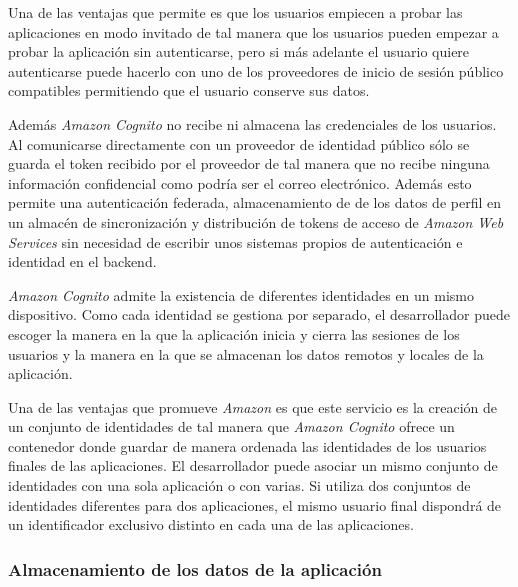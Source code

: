\documentclass{article}
\begin{document}
	Una de las ventajas que permite es que los usuarios empiecen a probar las aplicaciones en modo invitado de tal manera que los usuarios pueden empezar a probar la aplicación sin autenticarse, pero si más adelante el usuario quiere autenticarse puede hacerlo con uno de los proveedores de inicio de sesión público compatibles permitiendo que el usuario conserve sus datos. 
	
	
	Además \emph{Amazon Cognito} no recibe ni almacena las credenciales de los usuarios. Al comunicarse directamente con un proveedor de identidad público sólo se guarda el token recibido por el proveedor de tal manera que no recibe ninguna información confidencial como podría ser el correo electrónico. Además esto permite una autenticación federada, almacenamiento de de los datos de perfil en un almacén de sincronización y distribución de tokens de acceso de \emph{Amazon Web Services} sin necesidad de escribir unos sistemas propios de autenticación e identidad en el backend.

	\emph{Amazon Cognito} admite la existencia de diferentes identidades en un mismo dispositivo. Como cada identidad se gestiona por separado, el desarrollador puede escoger la manera en la que la aplicación inicia y cierra las sesiones de los usuarios y la manera en la que se almacenan los datos remotos y locales de la aplicación.

	Una de las ventajas que promueve \emph{Amazon} es que este servicio es la creación de un conjunto de identidades de tal manera que \emph{Amazon Cognito} ofrece un contenedor donde guardar de manera ordenada las identidades de los usuarios finales de las aplicaciones. El desarrollador puede asociar un mismo conjunto de identidades con una sola aplicación o con varias. Si utiliza dos conjuntos de identidades diferentes para dos aplicaciones, el mismo usuario final dispondrá de un identificador exclusivo distinto en cada una de las aplicaciones.

\subsubsection{Almacenamiento de los datos de la aplicación}
\end{document}
